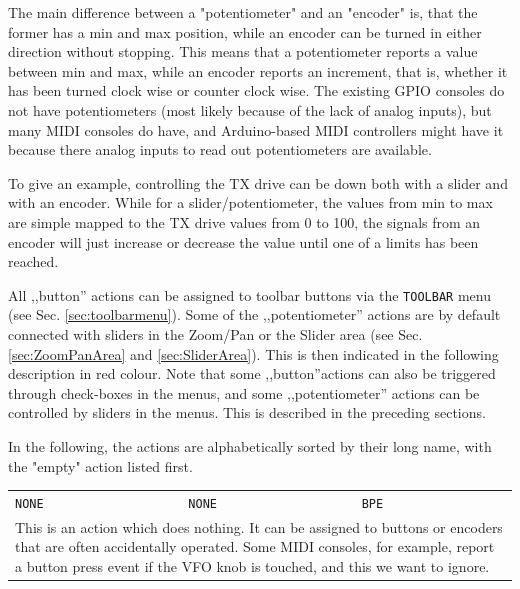 \documentclass[12pt]{book}
\def\bltt#1{\texttt{\color{blue}#1}}
\begin{document}
The main difference between a "potentiometer" and an "encoder" is, that the former has a min and max
position, while
an encoder can be turned in either direction without stopping. This means that a potentiometer
reports a value between min and max, while an encoder reports an increment,
that is, whether it has been turned clock wise or counter clock wise.
The existing GPIO consoles do not have potentiometers (most likely because of the lack of analog inputs),
but
many MIDI consoles do have, and Arduino-based MIDI controllers might have it because there analog inputs
to read out potentiometers are available.

To give an example, controlling the TX drive can be down both with a slider and with an encoder. While for
a slider/potentiometer, the values from min to max are simple mapped to the TX drive values from 0 to 100,
the signals from an encoder will just increase or decrease the value until one of a limits has been reached.

All ,,button'' actions can be assigned to toolbar buttons via the \bltt{TOOLBAR} menu
(see Sec. \ref{sec:toolbarmenu}). Some of the ,,potentiometer'' actions are by default connected
with sliders in the Zoom/Pan or the Slider area (see Sec. \ref{sec:ZoomPanArea} and \ref{sec:SliderArea}).
This is then indicated in the following description in red colour. Note that some ,,button''actions
can also be triggered through check-boxes in the menus, and some ,,potentiometer'' actions can be controlled
by sliders in the menus. This is described in the preceding sections.

In the following, the actions are alphabetically sorted by their long name, with the "empty" action listed
first.

\renewcommand{\belowrulesep}{0pt}
\renewcommand{\aboverulesep}{0pt}
\def\action#1#2#3#4{
\begin{center}
\begin{tabular}{|p{7cm}|p{3cm}|p{1cm}|}
\toprule
\bltt{\large #1} & \texttt{\large #2} & \texttt{\large #3}$\phantom{\Big|}$ \\\cline{1-3}
\multicolumn{3}{|p{\textwidth}|}{#4} \\
\bottomrule
\end{tabular}
\end{center}
}


\action{NONE}{NONE}{BPE}{This is an action which does nothing. It can be assigned to buttons or enco\-ders
that
are often accidentally operated. Some MIDI consoles, for example, report a button press event if the VFO
knob is touched, and this we want to ignore.}
\end{document}
